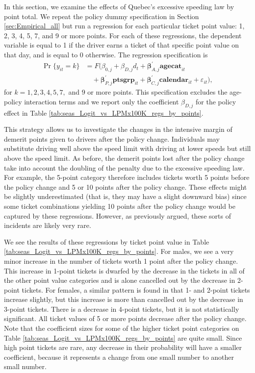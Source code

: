 \documentclass{cje}
\begin{document}
In this section, we examine the effects of Quebec’s excessive speeding law by point total. 
We repeat the policy dummy specification in 
Section \ref{sec:Empirical_all} 
but run a regression for each particular ticket point value: 1, 2, 3, 4, 5, 7, and 9 or more points. 
For each of these regressions, the dependent variable is equal to 1 
if the driver earns a ticket of that specific point value on that day, and is equal to 0 otherwise. 
The regression specification is 
%
\begin{align*}
	\Pr\{y_{it} = k\} & 	
	= F( \beta_{0,j} + \beta_{D,j} d_t
	+ \bm{\beta}_{A,j}^{\prime} \bm{agecat}_{it} \\
	&	\quad
	+ \bm{\beta}_{P,j}^{\prime} \bm{ptsgrp}_{it}
	+ \bm{\beta}_{C,j}^{\prime} \bm{calendar}_{it}
	+ \varepsilon_{it} ),
\end{align*}
%
for $k = 1, 2, 3, 4, 5, 7,$ and $9$ or more points. 
This specification excludes the age-policy interaction terms and we report 
only the coefficient $\beta_{D,j}$ for the policy effect
in Table \ref{tab:seas_Logit_vs_LPMx100K_regs_by_points}. 

This strategy allows us to investigate the changes in the intensive margin of 
demerit points given to drivers after the policy change. 
Individuals may substitute driving well above the speed limit with driving at lower speeds 
but still above the speed limit. 
As before, the demerit points lost after the policy change take into account 
the doubling of the penalty due to the excessive speeding law. 
For example, the 5-point category therefore includes tickets 
worth 5 points before the policy change and 5 or 10 points after the policy change. 
These effects might be slightly underestimated (that is, they may have a slight downward bias) 
since some ticket combinations yielding 10 points after the policy change 
would be captured by these regressions. 
However, as previously argued, these sorts of incidents are likely very rare. 


We see the results of these regressions by ticket point value in 
Table \ref{tab:seas_Logit_vs_LPMx100K_regs_by_points}. 
For males, we see a very minor increase in the number of tickets 
worth 1 point after the policy change. 
This increase in 1-point tickets is dwarfed by the decrease in the tickets 
in all of the other point value categories and is alone cancelled out 
by the decrease in 2-point tickets. 
For females, a similar pattern is found in that 1- and 2-point tickets increase slightly,
but this increase is more than cancelled out by the decrease in 3-point tickets. 
There is a decrease in 4-point tickets, but it is not statistically significant. 
All ticket values of 5 or more points decrease after the policy change. 
Note that the coefficient sizes for some of the higher ticket point categories on 
Table \ref{tab:seas_Logit_vs_LPMx100K_regs_by_points}
are quite small. Since high point tickets are rare, any decrease in their probability will have a smaller coefficient, 
because it represents a change from one small number to another small number.
\end{document}

